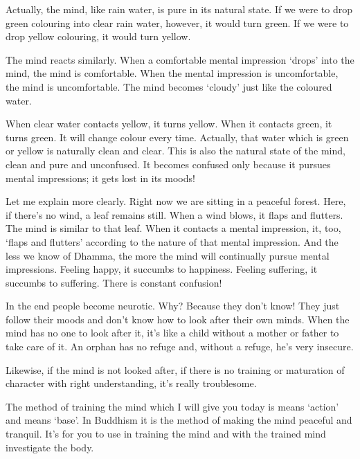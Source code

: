 Actually, the mind, like rain water, is pure in its natural state. If we were to drop green colouring into clear rain water, however, it would turn green. If we were to drop yellow colouring, it would turn yellow.

The mind reacts similarly. When a comfortable mental impression `drops' into the mind, the mind is comfortable. When the mental impression is uncomfortable, the mind is uncomfortable. The mind becomes `cloudy' just like the coloured water.

When clear water contacts yellow, it turns yellow. When it contacts green, it turns green. It will change colour every time. Actually, that water which is green or yellow is naturally clean and clear. This is also the natural state of the mind, clean and pure and unconfused. It becomes confused only because it pursues mental impressions; it gets lost in its moods!

Let me explain more clearly. Right now we are sitting in a peaceful forest. Here, if there's no wind, a leaf remains still. When a wind blows, it flaps and flutters. The mind is similar to that leaf. When it contacts a mental impression, it, too, `flaps and flutters' according to the nature of that mental impression. And the less we know of Dhamma, the more the mind will continually pursue mental impressions. Feeling happy, it succumbs to happiness. Feeling suffering, it succumbs to suffering. There is constant confusion!

In the end people become neurotic. Why? Because they don't know! They just follow their moods and don't know how to look after their own minds. When the mind has no one to look after it, it's like a child without a mother or father to take care of it. An orphan has no refuge and, without a refuge, he's very insecure.

Likewise, if the mind is not looked after, if there is no training or maturation of character with right understanding, it's really troublesome.

The method of training the mind which I will give you today is   means `action' and  means `base'. In Buddhism it is the method of making the mind peaceful and tranquil. It's for you to use in training the mind and with the trained mind investigate the body.

